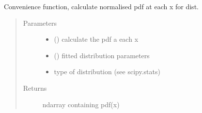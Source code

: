 \documentclass[letterpaper,10pt,english]{sphinxmanual}
\begin{document}
\begin{fulllineitems}
\label{\detokenize{tes:tes.analysis.normalised_pdf}}
\sphinxAtStartPar
Convenience function, calculate normalised pdf at each x for dist.
\begin{quote}\begin{description}
\item[{Parameters}] \leavevmode\begin{itemize}
\item {} 
\sphinxAtStartPar
{} (\sphinxstyleliteralemphasis{\sphinxupquote{{[}}}\sphinxstyleliteralemphasis{\sphinxupquote{, }}\sphinxstyleliteralemphasis{\sphinxupquote{{]}}}) \textendash{} calculate the pdf a each x

\item {} 
\sphinxAtStartPar
{} () \textendash{} fitted distribution parameters

\item {} 
\sphinxAtStartPar
{} \textendash{} type of distribution (see scipy.stats)

\end{itemize}

\item[{Returns}] \leavevmode
\sphinxAtStartPar
ndarray containing pdf(x)

\end{description}\end{quote}

\end{fulllineitems}


\begin{fulllineitems}
\label{\detokenize{tes:tes.analysis.outcome_probabilities}}
\end{fulllineitems}
\end{document}
